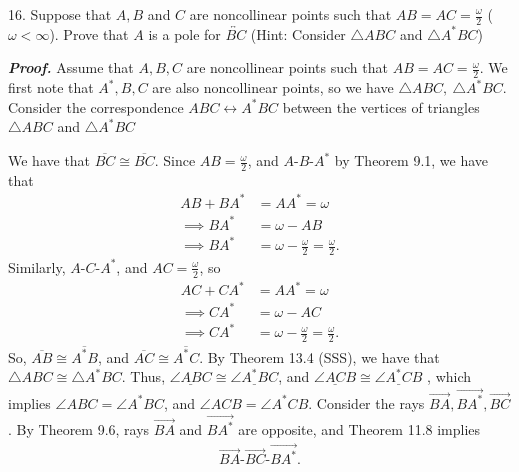 \documentclass{report}
\begin{document}
    \bigbreak \noindent 
    \begin{mdframed}
        16. Suppose that $A,B$ and $C$ are noncollinear points such that $AB = AC = \frac{\omega}{2}$ ($\omega < \infty$). Prove that $A$ is a pole for $ \overleftrightarrow{BC}$ (Hint: Consider $\triangle ABC$ and $\triangle A^{*}BC$)
    \end{mdframed}
    \bigbreak \noindent 
    \textbf{\textit{Proof.}} Assume that $A,B,C$ are noncollinear points such that $AB = AC = \frac{\omega}{2}$. 
    \bigbreak \noindent 
    We first note that $A^{*},B,C$ are also noncollinear points, so we have $\triangle ABC,\ \triangle A^{*}BC $. Consider the correspondence $ABC \leftrightarrow A^{*}BC$ between the vertices of triangles $\triangle ABC$ and $ \triangle A^{*}BC$
    \bigbreak \noindent 
    \begin{figure}[ht]
        \centering
        \label{fig:tri4}
    \end{figure}
    \bigbreak \noindent 
    We have that $\overline{BC} \cong \overline{BC}$. Since $AB = \frac{\omega}{2}$, and $ A\text{-}B\text{-}A^{*}$ by Theorem 9.1, we have that
    \begin{align*}
        AB + BA^{*} &= AA^{*} = \omega \\
        \implies BA^{*} &= \omega - AB \\
        \implies BA^{*} &= \omega - \frac{\omega}{2} = \frac{\omega}{2}
    .\end{align*}
    Similarly, $ A\text{-}C\text{-}A^{*}$, and $AC = \frac{\omega}{2}$, so
    \begin{align*}
        AC + CA^{*} &= AA^{*} = \omega \\
        \implies CA^{*} &= \omega - AC \\
        \implies CA^{*} &= \omega-\frac{\omega}{2} = \frac{\omega}{2}
    .\end{align*} 
    So, $\overline{AB} \cong \overline{A^{*}B}$, and $\overline{AC} \cong \overline{A^{*}C}$. By Theorem 13.4 (SSS), we have that $\triangle ABC \cong \triangle A^{*}BC$. Thus, $ \underline{\angle ABC} \cong \underline{\angle A^{*}BC}$, and $\underline{\angle ACB} \cong\underline{\angle A^{*}CB} $ , which implies $\angle ABC = \angle A^{*}BC $, and $ \angle ACB = \angle A^{*}CB$.
    \bigbreak \noindent 
    Consider the rays $\overrightarrow{BA},\overrightarrow{BA^{*}}, \overrightarrow{BC}$. By Theorem 9.6, rays $\overrightarrow{BA}$ and $\overrightarrow{BA^{*}}$ are opposite, and Theorem 11.8 implies
    \begin{align*}
        \overrightarrow{BA}\text{-}\overrightarrow{BC}\text{-}\overrightarrow{BA^{*}}
    .\end{align*}
\end{document}
